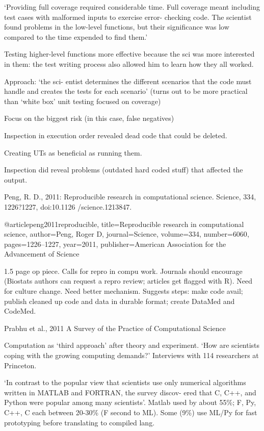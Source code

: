 \documentclass[12pt]{amsart}
\begin{document}
`Providing full coverage required considerable time. Full coverage meant including test cases with malformed inputs to exercise error- checking code. The scientist found problems in the low-level functions, but their significance was low compared to the time expended to find them.'

Testing higher-level functions more effective because the sci was more interested in them: the test writing process also allowed him to learn how they all worked.

Approach: `the sci- entist determines the different scenarios that the code must handle and creates the tests for each scenario' (turns out to be more practical than `white box' unit testing focused on coverage)

Focus on the biggest risk (in this case, false negatives)

Inspection in execution order revealed dead code that could be deleted.

Creating UTs as beneficial as running them.

Inspection did reveal problems (outdated hard coded stuff) that affected the output.



Peng, R. D., 2011: Reproducible research in computational science. Science, 334, 1226?1227, doi:10.1126 /science.1213847.

@article{peng2011reproducible,
  title={Reproducible research in computational science},
  author={Peng, Roger D},
  journal={Science},
  volume={334},
  number={6060},
  pages={1226--1227},
  year={2011},
  publisher={American Association for the Advancement of Science}
}

1.5 page op piece. Calls for repro in compu work. Journals should encourage (Biostats authors can request a repro review; articles get flagged with R). Need for culture change. Need better mechanism. Suggests steps: make code avail; publish cleaned up code and data in durable format; create DataMed and CodeMed.



Prabhu et al., 2011 A Survey of the Practice of Computational Science

Computation as `third approach' after theory and experiment. `How are scientists coping with the growing computing demands?' Interviews with 114 researchers at Princeton.

`In contrast to the popular view that scientists use only numerical algorithms written in MATLAB and FORTRAN, the survey discov- ered that C, C++, and Python were popular among many scientists'. Matlab used by about 55\%; F, Py, C++, C each between 20-30\% (F second to ML). Some (9\%) use ML/Py for fast prototyping before translating to compiled lang.
\end{document}
